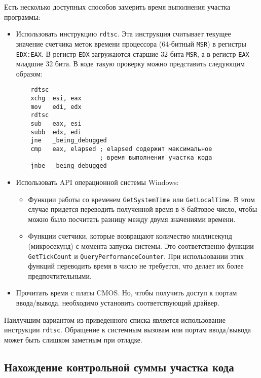 Есть несколько доступных способов замерить время выполнения участка программы:
\begin{itemize}
  \item Использовать инструкцию \verb!rdtsc!. Эта инструкция считывает текущее
    значение счетчика меток времени процессора (64-битный \verb!MSR!) в регистры
    \verb!EDX:EAX!. В регистр \verb!EDX! загружаются старшие 32 бита \verb!MSR!,
    а в регистр \verb!EAX! младшие 32 бита. В коде такую проверку можно
    представить следующим образом:
    \begin{verbatim}
    rdtsc
    xchg  esi, eax
    mov   edi, edx
    rdtsc
    sub   eax, esi
    subb  edx, edi
    jne   _being_debugged
    cmp   eax, elapsed ; elapsed содержит максимальное
                       ; время выполнения участка кода
    jnbe  _being_debugged
    \end{verbatim}

  \item Использовать API операционной системы Windows:
    \begin{itemize}
      \item Функции работы со временем \verb!GetSystemTime! или
        \verb!GetLocalTime!. В этом случае придется переводить полученной время
        в 8-байтовое число, чтобы можно было посчитать разницу между двумя
        значениями времени.
      \item Функции счетчики, которые возвращают количество миллисекунд
        (микросекунд) с момента запуска системы. Это соответственно функции
        \verb!GetTickCount! и \verb!QueryPerformanceCounter!. При использовании
        этих функций переводить время в число не требуется, что делает их более
        предпочтительными.
    \end{itemize}

  \item Прочитать время с платы CMOS. Но, чтобы получить доступ к портам
    ввода/вывода, необходимо установить соответствующий драйвер.
\end{itemize}

Наилучшим вариантом из приведенного списка является использование инструкции
\verb!rdtsc!. Обращение к системным вызовам или портам ввода/вывода может быть
слишком заметным при отладке.

\subsection{Нахождение контрольной суммы участка кода}

